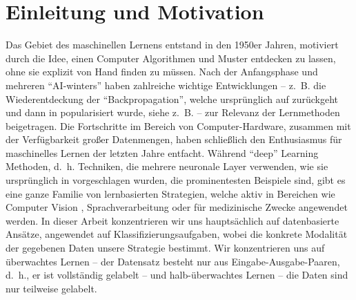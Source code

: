 \section*{Einleitung und Motivation}
%
%
Das Gebiet des maschinellen Lernens entstand in den 1950er Jahren, motiviert durch die Idee, einen Computer Algorithmen und Muster entdecken zu lassen, ohne sie explizit von Hand finden zu müssen. Nach der Anfangsphase und mehreren \enquote{AI-winters} \cite{steele1996evolution} haben zahlreiche wichtige Entwicklungen -- z.~B. die Wiederentdeckung der \enquote{Backpropagation}, welche ursprünglich auf \cite{kelley1960gradient,rosenblatt1962principles} zurückgeht und dann in \cite{rumelhart1986learning} popularisiert wurde, siehe z.~B. \cite{schmidhuber2022annotated} -- zur Relevanz der Lernmethoden beigetragen. Die Fortschritte im Bereich von Computer-Hardware, zusammen mit der Verfügbarkeit gro\ss{}er Datenmengen, haben schlie\ss{}lich den Enthusiasmus für maschinelles Lernen der letzten Jahre entfacht. Während \enquote{deep} Learning Methoden, d.~h. Techniken, die mehrere neuronale Layer verwenden, wie sie ursprünglich in \cite{rosenblatt1958perceptron} vorgeschlagen wurden, die prominentesten Beispiele sind, gibt es eine ganze Familie von lernbasierten Strategien, welche aktiv in Bereichen wie Computer Vision \cite{chai2021deep}, Sprachverarbeitung \cite{khurana2023natural} oder für medizinische Zwecke \cite{shehab2022machine} angewendet werden. In dieser Arbeit konzentrieren wir uns hauptsächlich auf datenbasierte Ansätze, angewendet auf Klassifizierungsaufgaben, wobei die konkrete Modalität der gegebenen Daten unsere Strategie bestimmt. Wir konzentrieren uns auf überwachtes Lernen -- der Datensatz besteht nur aus Eingabe-Ausgabe-Paaren, d.~h., er ist vollständig gelabelt -- und halb-überwachtes Lernen -- die Daten sind nur teilweise gelabelt.

